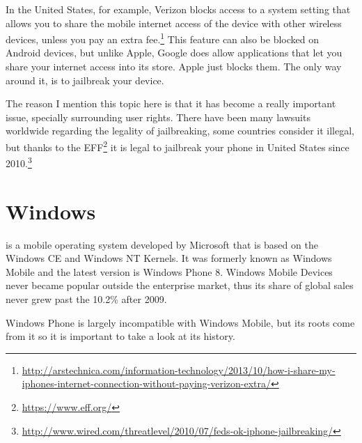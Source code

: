 In the United States, for example, Verizon blocks access to a system setting that allows you to share the mobile internet access of the device with other wireless devices, unless you pay an extra fee.\footnote{\url{http://arstechnica.com/information-technology/2013/10/how-i-share-my-iphones-internet-connection-without-paying-verizon-extra/}} This feature can also be blocked on Android devices, but unlike Apple, Google does allow applications that let you share your internet access into its store. Apple just blocks them. The only way around it, is to jailbreak your device.

The reason I mention this topic here is that it has become a really important issue, specially surrounding user rights. There have been many lawsuits worldwide regarding the legality of jailbreaking, some countries consider it illegal, but thanks to the EFF\footnote{\url{https://www.eff.org/}} it is legal to jailbreak your phone in United States since 2010.\footnote{\url{http://www.wired.com/threatlevel/2010/07/feds-ok-iphone-jailbreaking/}}      

\section{Windows}
 is a mobile operating system developed by Microsoft that is based on the Windows CE and Windows NT Kernels. It was formerly known as Windows Mobile and the latest version is Windows Phone 8. Windows Mobile Devices never became popular outside the enterprise market, thus its share of global sales never grew past the 10.2\% after 2009. 


Windows Phone is largely incompatible with Windows Mobile, but its roots come from it so it is important to take a look at its history.
